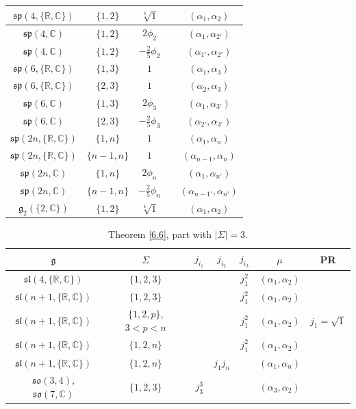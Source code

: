\documentclass[10pt,a4paper]{amsart}
\newcommand{\Si}{\Sigma}
\newcommand{\fg}{\mathfrak g}
\newcommand{\C}{\mathbb{C}}
\numberwithin{equation}{section}
\begin{document}
\begin{table}[th!]
\begin{tabular}{|c|c|c|c|c|}
\hline
$\mathfrak{sp}(4,\{\mathbb{R, C}\})$& $\{1,2\}$ &$\sqrt[3]{1}$&& $(\alpha_1,\alpha_2)$ \\
\hline
$\mathfrak{sp}(4,\mathbb{C})$ & $\{1,2\}$&$2\phi_2$& & $(\alpha_{1},\alpha_{2'})$ \\
\hline
$\mathfrak{sp}(4,\mathbb{C})$ & $\{1,2\}$&$-\frac25\phi_2$&& $(\alpha_{1'},\alpha_{2'})$ \\
\hline
$\mathfrak{sp}(6,\{\mathbb{R, C}\})$& $\{1,3\}$ &$1$&& $(\alpha_1,\alpha_3)$ \\
\hline
$\mathfrak{sp}(6,\{\mathbb{R, C}\})$& $\{2,3\}$&$1$&& $(\alpha_{2},\alpha_3)$ \\
\hline
$\mathfrak{sp}(6,\mathbb{C})$ & $\{1,3\}$&$2\phi_3$& & $(\alpha_{1},\alpha_{3'})$ \\
\hline
$\mathfrak{sp}(6,\mathbb{C})$ & $\{2,3\}$&$-\frac25\phi_3$&& $(\alpha_{2'},\alpha_{3'})$ \\
\hline
$\mathfrak{sp}(2n,\{\mathbb{R, C}\})$& $\{1,n\}$ &$1$&& $(\alpha_1,\alpha_n)$ \\
\hline
$\mathfrak{sp}(2n,\{\mathbb{R, C}\})$& $\{n-1,n\}$&$1$&& $(\alpha_{n-1},\alpha_n)$ \\
\hline
$\mathfrak{sp}(2n,\mathbb{C})$ & $\{1,n\}$&$2\phi_n$& & $(\alpha_{1},\alpha_{n'})$ \\
\hline
$\mathfrak{sp}(2n,\mathbb{C})$ & $\{n-1,n\}$&$-\frac25\phi_n$&& $(\alpha_{n-1'},\alpha_{n'})$ \\
\hline
$\mathfrak{g}_2(\{2,\C\})$ & $\{1,2\}$ & $\sqrt[4]{1}$ && $(\alpha_1,\alpha_2)$ \\
\hline
\end{tabular}
\end{table}

\begin{table}[th!]\centering\caption{Theorem \ref{6.6}, part with $|\Si|=3$.}\label{ahs11}\vspace{1mm}

\begin{tabular}{|c|c|c|c|c|c|c|}
\hline
$\fg$ & $\Sigma$ & $j_{i_1}$& $j_{i_2}$& $j_{i_3}$&$\mu$&PR \\
\hline
\hline
$\mathfrak{sl}(4,\{\mathbb{R, C}\})$ &$\{1,2,3\}$ &&&$j_1^2$&$(\alpha_1,\alpha_2)$ & \\
\hline
$\mathfrak{sl}(n+1,\{\mathbb{R, C}\})$ &$\{1,2,3\}$ &&&$j_1^2$&$(\alpha_1,\alpha_2)$ & \\
\hline
$\mathfrak{sl}(n+1,\{\mathbb{R, C}\})$ &$\{1,2,p\}$, $3<p<n$ &&&$j_1^2$&$(\alpha_1,\alpha_2)$ & $j_1=\sqrt{1}$ \\
\hline
$\mathfrak{sl}(n+1,\{\mathbb{R, C}\})$ &$\{1,2,n\}$ &&&$j_1^2$&$(\alpha_1,\alpha_2)$ &\\
\hline
$\mathfrak{sl}(n+1,\{\mathbb{R, C}\})$&$\{1,2,n\}$ && $j_1j_n$& &$(\alpha_1,\alpha_n)$& \\
\hline
$\mathfrak{so}(3,4)$, $\mathfrak{so}(7,\mathbb{C})$&$\{1,2,3\}$& $j_3^3 $&&&$(\alpha_3,\alpha_2)$& \\
\hline
\end{tabular}
\end{table}
\end{document}
